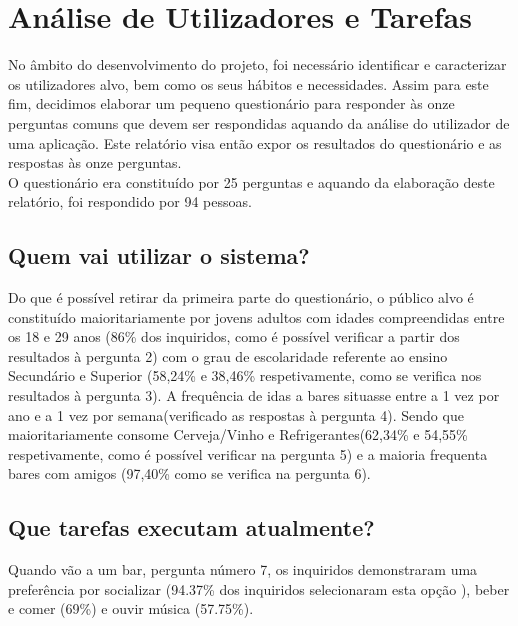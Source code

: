 \documentclass{article}
\begin{document}
\section*{Análise de Utilizadores e Tarefas}

No âmbito do desenvolvimento do projeto, foi necessário identificar e caracterizar os utilizadores alvo, bem como os seus hábitos e necessidades. Assim para este fim, decidimos elaborar um pequeno questionário para responder às onze perguntas comuns que devem ser respondidas aquando da análise do utilizador de uma aplicação. Este relatório visa então expor os resultados do questionário e as respostas às onze perguntas.\\
O questionário era constituído por 25 perguntas e aquando da elaboração deste relatório, foi respondido por 94 pessoas.

\subsection*{Quem vai utilizar o sistema?}
Do que é possível retirar da primeira parte do questionário, o público alvo é constituído maioritariamente por jovens adultos com idades compreendidas entre os 18 e 29 anos (86\% dos inquiridos, como é possível verificar a partir dos resultados à pergunta 2) com o grau de escolaridade referente ao ensino Secundário e Superior (58,24\% e 38,46\% respetivamente, como se verifica nos resultados à pergunta 3). A frequência de idas a bares situasse entre a 1 vez por ano e a 1 vez por semana(verificado as respostas à pergunta 4). Sendo que maioritariamente consome Cerveja/Vinho e Refrigerantes(62,34\% e 54,55\% respetivamente, como é possível verificar na pergunta 5) e a maioria frequenta bares com amigos (97,40\% como se verifica na pergunta 6).
\subsection*{Que tarefas executam atualmente?}
Quando vão a um bar, pergunta número 7, os inquiridos demonstraram uma preferência por socializar (94.37\% dos inquiridos selecionaram esta opção ), beber e comer (69\%) e ouvir música (57.75\%).

\end{document}
